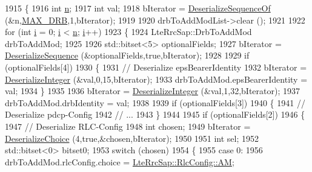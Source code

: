 \begin{DoxyCode}
1915 \{
1916   \textcolor{keywordtype}{int} \hyperlink{namespacesample-rng-plot_aeb5ee5c431e338ef39b7ac5431242e1d}{n};
1917   \textcolor{keywordtype}{int} val;
1918   bIterator = \hyperlink{classns3_1_1Asn1Header_a1a7245e05b482df8abade0a060bd0ecc}{DeserializeSequenceOf} (&n,\hyperlink{lte-rrc-header_8cc_a3007772924a76edef0d1eb9c400abdac}{MAX\_DRB},1,bIterator);
1919 
1920   drbToAddModList->clear ();
1921 
1922   \textcolor{keywordflow}{for} (\textcolor{keywordtype}{int} \hyperlink{bernuolliDistribution_8m_a6f6ccfcf58b31cb6412107d9d5281426}{i} = 0; \hyperlink{bernuolliDistribution_8m_a6f6ccfcf58b31cb6412107d9d5281426}{i} < \hyperlink{namespacesample-rng-plot_aeb5ee5c431e338ef39b7ac5431242e1d}{n}; \hyperlink{bernuolliDistribution_8m_a6f6ccfcf58b31cb6412107d9d5281426}{i}++)
1923     \{
1924       LteRrcSap::DrbToAddMod drbToAddMod;
1925 
1926       std::bitset<5> optionalFields;
1927       bIterator = \hyperlink{classns3_1_1Asn1Header_a58c68bb97ba3fe2e8fcdd7c208d672b2}{DeserializeSequence} (&optionalFields,\textcolor{keyword}{true},bIterator);
1928 
1929       \textcolor{keywordflow}{if} (optionalFields[4])
1930         \{
1931           \textcolor{comment}{// Deserialize epsBearerIdentity}
1932           bIterator = \hyperlink{classns3_1_1Asn1Header_a49802c9af30018b078150e866b6ecae2}{DeserializeInteger} (&val,0,15,bIterator);
1933           drbToAddMod.epsBearerIdentity = val;
1934         \}
1935 
1936       bIterator = \hyperlink{classns3_1_1Asn1Header_a49802c9af30018b078150e866b6ecae2}{DeserializeInteger} (&val,1,32,bIterator);
1937       drbToAddMod.drbIdentity = val;
1938 
1939       \textcolor{keywordflow}{if} (optionalFields[3])
1940         \{
1941           \textcolor{comment}{// Deserialize pdcp-Config}
1942           \textcolor{comment}{// ...}
1943         \}
1944 
1945       \textcolor{keywordflow}{if} (optionalFields[2])
1946         \{
1947           \textcolor{comment}{// Deserialize RLC-Config}
1948           \textcolor{keywordtype}{int} chosen;
1949           bIterator = \hyperlink{classns3_1_1Asn1Header_a0af5881f07a0549a8693a1b75c229a90}{DeserializeChoice} (4,\textcolor{keyword}{true},&chosen,bIterator);
1950 
1951           \textcolor{keywordtype}{int} sel;
1952           std::bitset<0> bitset0;
1953           \textcolor{keywordflow}{switch} (chosen)
1954             \{
1955             \textcolor{keywordflow}{case} 0:
1956               drbToAddMod.rlcConfig.choice = \hyperlink{structns3_1_1LteRrcSap_1_1RlcConfig_ab6ab94ca4abaf717926f31db4dddc61baac722b7609a143367fc24a94f8e4f6c7}{LteRrcSap::RlcConfig::AM};

\end{DoxyCode}
